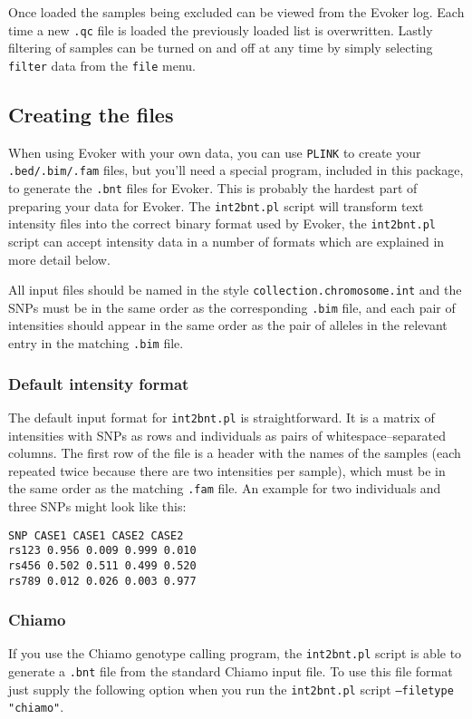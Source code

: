 \documentclass{article}
\begin{document}
Once loaded the samples being excluded can be viewed from the Evoker log. Each time a new \texttt{.qc} file is loaded the previously loaded list is overwritten. Lastly filtering of samples can be turned on and off at any time by simply selecting \texttt{filter} data from the \texttt{file} menu.

\subsection{Creating the files}

When using Evoker with your own data, you can use \texttt{PLINK} to create your \texttt{.bed/.bim/.fam} files, but you'll need a special program, included in this package, to generate the \texttt{.bnt} files for Evoker. This is probably the hardest part of preparing your data for Evoker. The \texttt{int2bnt.pl} script will transform text intensity files into the correct binary format used by Evoker, the \texttt{int2bnt.pl} script can accept intensity data in a number of formats which are explained in more detail below.

All input files should be named in the style \texttt{collection.chromosome.int} and the SNPs must be in the same order as the corresponding \texttt{.bim} file, and each pair of intensities should appear in the same order as the pair of alleles in the relevant entry in the matching \texttt{.bim} file.

\subsubsection{Default intensity format}
The default input format for \texttt{int2bnt.pl} is straightforward. It is a matrix of intensities with SNPs as rows and individuals as pairs of whitespace--separated columns. The first row of the file is a header with the names of the samples (each repeated twice because there are two intensities per sample), which must be in the same order as the matching \texttt{.fam} file. An example for two individuals and three SNPs might look like this:

\begin{verbatim}
SNP CASE1 CASE1 CASE2 CASE2
rs123 0.956 0.009 0.999 0.010
rs456 0.502 0.511 0.499 0.520
rs789 0.012 0.026 0.003 0.977
\end{verbatim}

\subsubsection{Chiamo}
If you use the Chiamo genotype calling program, the \texttt{int2bnt.pl} script is able to generate a \texttt{.bnt} file from the standard Chiamo input file. To use this file format just supply the following option when you run the \texttt{int2bnt.pl} script \texttt{--filetype "chiamo"}.
\end{document}
